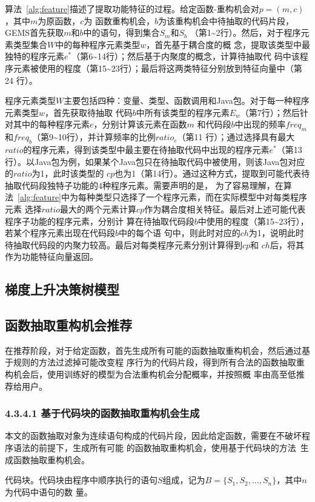 算法~\ref{alg:feature}描述了提取功能特征的过程。给定函数-重构机会对$p=(m,c)$，其中$m$为原函数，$c$为
函数重构机会，$b$为该重构机会中待抽取的代码片段，GEMS首先获取$m$和$b$中的语句，得到集合$S_m$和$S_b$
（第1\textasciitilde2行）。然后，对于程序元素类型集合$W$中的每种程序元素类型$w$，首先基于耦合度的概
念，提取该类型中最独特的程序元素$e^*$（第6\textasciitilde14行）；然后基于内聚度的概念，计算待抽取代
码中该程序元素被使用的程度（第15\textasciitilde23行）；最后将这两类特征分别放到特征向量中（第24
行）。

程序元素类型$W$主要包括四种：变量、类型、函数调用和Java包。对于每一种程序元素类型$w$，首先获取待抽取
代码$b$中所有该类型的程序元素$E_w$（第7行）；然后针对其中的每种程序元素$e$，分别计算该元素在函数$m$
和代码段$b$中出现的频率$freq_m$和$freq_b$（第9\textasciitilde10行），并计算频率的比例$ratio_e$（第11
行）；通过选择具有最大$ratio$的程序元素，得到该类型中最主要在待抽取代码中出现的程序元素$e^*$（第13
行）。以Java包为例，如果某个Java包只在待抽取代码中被使用，则该Java包对应的$ratio$为1，此时该类型的
$cp$也为1（第14行）。通过这种方式，提取到可能代表待抽取代码段独特子功能的4种程序元素。需要声明的是，
为了容易理解，在算法~\ref{alg:feature}中为每种类型只选择了一个程序元素，而在实际模型中对每类程序元素
选择$ratio$最大的两个元素计算$cp$作为耦合度相关特征。最后对上述可能代表程序子功能的程序元素，分别计
算在待抽取代码段$b$中使用的程度（第15\textasciitilde23行），若某个程序元素出现在代码段$b$中的每个语
句中，则此时对应的$ch$为1，说明此时待抽取代码段的内聚力较高。最后对每类程序元素分别计算得到$cp$和
$ch$后，将其作为功能特征向量返回。

\subsection{梯度上升决策树模型}


\subsection{函数抽取重构机会推荐}
在推荐阶段，对于给定函数，首先生成所有可能的函数抽取重构机会，然后通过基于规则的方法过滤掉可能改变程
序行为的代码片段，得到所有合法的函数抽取重构机会后，使用训练好的模型为合法重构机会分配概率，并按照概
率由高至低推荐给用户。

\subsubsection{4.3.4.1 基于代码块的函数抽取重构机会生成}
本文的函数抽取对象为连续语句构成的代码片段，因此给定函数，需要在不破坏程序语法的前提下，生成所有可能
的函数抽取重构机会，使用基于代码块的方法~\cite{silva:ICPC14}生成函数抽取重构机会。
\begin{Definition}\label{block}
  代码块。代码块由程序中顺序执行的语句$S$组成，记为$B=\{S_1,S_2,...,S_n\}$，其中$n$为代码中语句的数
  量。
\end{Definition}

